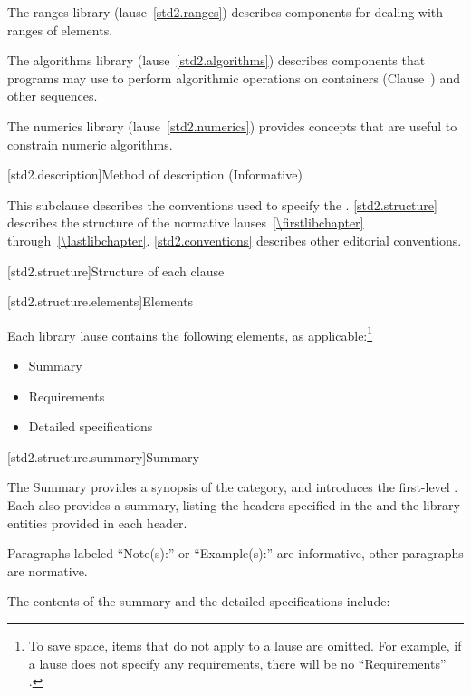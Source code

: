 \pnum
The ranges library (lause~\ref{std2.ranges}) describes components for dealing with
ranges of elements.

\pnum
The algorithms library (lause~\ref{std2.algorithms}) describes components that \Cpp
programs may use to perform algorithmic operations on containers
(Clause~) and other sequences.

\pnum
The numerics library (lause~\ref{std2.numerics}) provides concepts that are useful
to constrain numeric algorithms.

[std2.description]{Method of description (Informative)}

\pnum
This subclause describes the conventions used to specify the . \ref{std2.structure} describes the structure of the normative
lauses~\ref{\firstlibchapter} through~\ref{\lastlibchapter}. \ref{std2.conventions} describes other editorial conventions.

[std2.structure]{Structure of each clause}

[std2.structure.elements]{Elements}

\pnum
Each library lause contains the following elements, as applicable:\footnote{To
save space, items that do not apply to a lause are omitted.
For example, if a lause does not specify any requirements,
there will be no ``Requirements'' .}

\begin{itemize}
\item Summary
\item Requirements
\item Detailed specifications
\end{itemize}

[std2.structure.summary]{Summary}

\pnum
The Summary provides a synopsis of the category, and introduces the first-level .
Each  also provides a summary, listing the headers specified in the
 and the library entities provided in each header.

\pnum
Paragraphs labeled ``Note(s):'' or ``Example(s):'' are informative, other paragraphs
are normative.

\pnum
The contents of the summary and the detailed specifications include:

